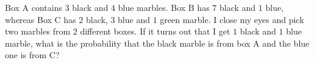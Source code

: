 Box A contains $3$ black and $4$ blue marbles. Box B has $7$ black and $1$ blue, whereas Box C has $2$ black, $3$ blue and $1$ green marble. I close my eyes and pick two marbles from $2$ different boxes. If it turns out that I get $1$ black and $1$ blue marble, what is the probability that the black marble is from box A and the blue one is from C?
